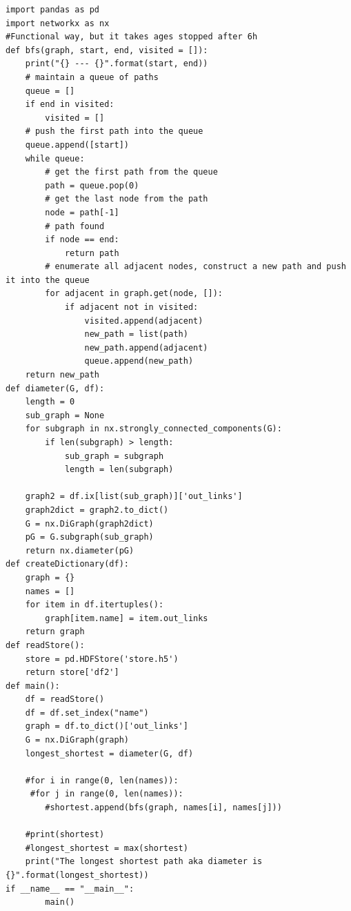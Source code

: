 \documentclass{WeSTassignment}
\begin{document}
\begin{lstlisting}
import pandas as pd
import networkx as nx
#Functional way, but it takes ages stopped after 6h
def bfs(graph, start, end, visited = []):
    print("{} --- {}".format(start, end))
    # maintain a queue of paths
    queue = []
    if end in visited:
        visited = []
    # push the first path into the queue
    queue.append([start])
    while queue:
        # get the first path from the queue
        path = queue.pop(0)
        # get the last node from the path
        node = path[-1]
        # path found
        if node == end:
            return path
        # enumerate all adjacent nodes, construct a new path and push it into the queue
        for adjacent in graph.get(node, []):
            if adjacent not in visited:
                visited.append(adjacent)
                new_path = list(path)
                new_path.append(adjacent)
                queue.append(new_path)
    return new_path
def diameter(G, df):
    length = 0
    sub_graph = None
    for subgraph in nx.strongly_connected_components(G):
        if len(subgraph) > length:
            sub_graph = subgraph
            length = len(subgraph)

    graph2 = df.ix[list(sub_graph)]['out_links']
    graph2dict = graph2.to_dict()
    G = nx.DiGraph(graph2dict)
    pG = G.subgraph(sub_graph)
    return nx.diameter(pG)
def createDictionary(df):
    graph = {}
    names = []
    for item in df.itertuples():
        graph[item.name] = item.out_links
    return graph
def readStore():
    store = pd.HDFStore('store.h5')
    return store['df2']
def main():
    df = readStore()
    df = df.set_index("name")
    graph = df.to_dict()['out_links']
    G = nx.DiGraph(graph)
    longest_shortest = diameter(G, df)

    #for i in range(0, len(names)):
     #for j in range(0, len(names)):
        #shortest.append(bfs(graph, names[i], names[j]))

    #print(shortest)
    #longest_shortest = max(shortest)
    print("The longest shortest path aka diameter is {}".format(longest_shortest))
if __name__ == "__main__":
        main()

\end{lstlisting}


\makefooter
\end{document}
